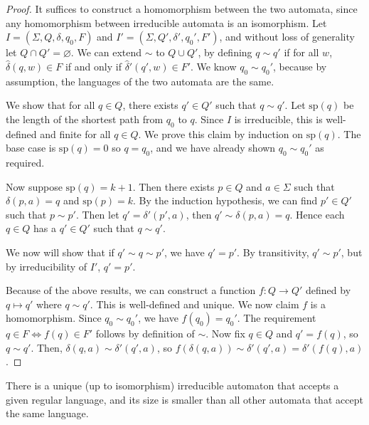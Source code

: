 \begin{proof}
	It suffices to construct a homomorphism between the two automata, since any homomorphism between irreducible automata is an isomorphism.
	Let \( I = (\Sigma, Q, \delta, q_0, F) \) and \( I' = (\Sigma, Q', \delta', q_0', F') \), and without loss of generality let \( Q \cap Q' = \varnothing \).
	We can extend \( \sim \) to \( Q \cup Q' \), by defining \( q \sim q' \) if for all \( w \), \( \hat\delta(q,w) \in F \) if and only if \( \hat\delta'(q',w) \in F' \).
	We know \( q_0 \sim q_0' \), because by assumption, the languages of the two automata are the same.

	We show that for all \( q \in Q \), there exists \( q' \in Q' \) such that \( q \sim q' \).
	Let \( \mathrm{sp}(q) \) be the length of the shortest path from \( q_0 \) to \( q \).
	Since \( I \) is irreducible, this is well-defined and finite for all \( q \in Q \).
	We prove this claim by induction on \( \mathrm{sp}(q) \).
	The base case is \( \mathrm{sp}(q) = 0 \) so \( q = q_0 \), and we have already shown \( q_0 \sim q_0' \) as required.

	Now suppose \( \mathrm{sp}(q) = k + 1 \).
	Then there exists \( p \in Q \) and \( a \in \Sigma \) such that \( \delta(p,a) = q \) and \( \mathrm{sp}(p) = k \).
	By the induction hypothesis, we can find \( p' \in Q' \) such that \( p \sim p' \).
	Then let \( q' = \delta'(p',a) \), then \( q' \sim \delta(p,a) = q \).
	Hence each \( q \in Q \) has a \( q' \in Q' \) such that \( q \sim q' \).

	We now will show that if \( q' \sim q \sim p' \), we have \( q' = p' \).
	By transitivity, \( q' \sim p' \), but by irreducibility of \( I' \), \( q' = p' \).

	Because of the above results, we can construct a function \( f \colon Q \to Q' \) defined by \( q \mapsto q' \) where \( q \sim q' \).
	This is well-defined and unique.
	We now claim \( f \) is a homomorphism.
	Since \( q_0 \sim q_0' \), we have \( f(q_0) = q_0' \).
	The requirement \( q \in F \iff f(q) \in F' \) follows by definition of \( \sim \).
	Now fix \( q \in Q \) and \( q' = f(q) \), so \( q \sim q' \).
	Then, \( \delta(q,a) \sim \delta'(q',a) \), so \( f(\delta(q,a)) \sim \delta'(q',a) = \delta'(f(q),a) \).
\end{proof}
\begin{remark}
	There is a unique (up to isomorphism) irreducible automaton that accepts a given regular language, and its size is smaller than all other automata that accept the same language.
\end{remark}

